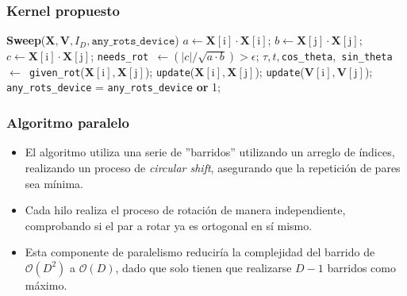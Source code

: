 \begin{frame}
\frametitle{Kernel propuesto}
\begin{algorithm}[H]
    \scriptsize
    \caption{\texttt{Sweep} kernel}
    \begin{algorithmic}[1]
        \State \textbf{Sweep}($\mathbf{X},\mathbf{V},I_D,\texttt{any\_rots\_device}$)
            \State $a \gets \mathbf{X}[\text{i}] \cdot \mathbf{X}[\text{i}]$;
            \State $b \gets \mathbf{X}[\text{j}] \cdot \mathbf{X}[\text{j}]$;
            \State $c \gets \mathbf{X}[\text{i}] \cdot \mathbf{X}[\text{j}]$;
            \State \texttt{needs\_rot }$\gets(|c|/\sqrt{a\cdot b}) > \epsilon$;
                \State $\tau, t,$\texttt{cos\_theta},\texttt{ sin\_theta }$\gets $\texttt{ given\_rot}($\mathbf{X}[\text{i}], \mathbf{X}[\text{j}]$);
                \State \texttt{update}($\mathbf{X}[\text{i}], \mathbf{X}[\text{j}]$);
                \State \texttt{update}($\mathbf{V}[\text{i}], \mathbf{V}[\text{j}]$);
                \State \texttt{any\_rots\_device} = \texttt{any\_rots\_device} \textbf{or} 1;
            \EndIf
        \EndFor
    \end{algorithmic}
\end{algorithm}
\end{frame}

\begin{frame}
\frametitle{Algoritmo paralelo}
\begin{itemize}
    \item El algoritmo utiliza una serie de ''barridos'' utilizando un arreglo de índices, realizando un proceso de \textit{circular shift}, asegurando que la repetición de pares sea mínima.
    \item Cada hilo realiza el proceso de rotación de manera independiente, comprobando si el par a rotar ya es ortogonal en sí mismo.
    \item Esta componente de paralelismo reduciría la complejidad del barrido de $\mathcal{O} (D^2)$ a $\mathcal{O}(D)$, dado que solo tienen que realizarse $D-1$ barridos como máximo.
\end{itemize}
\end{frame}


